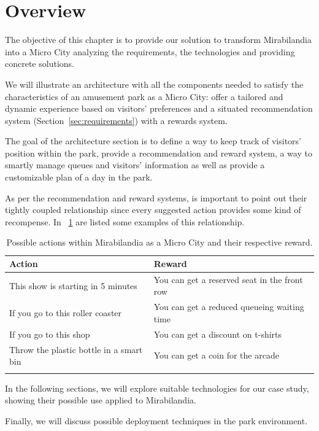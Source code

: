 \section{Overview}\label{sec:overview}
The objective of this chapter is to provide our solution to transform Mirabilandia into a Micro City analyzing the requirements, the technologies and providing concrete solutions.

We will illustrate an architecture with all the components needed to satisfy the characteristics of an amusement park as a Micro City: offer a tailored and dynamic experience based on visitors' preferences and a situated recommendation system (Section~\ref{sec:requirements}) with a rewards system.

The goal of the architecture section is to define a way to keep track of visitors' position within the park, provide a recommendation and reward system, a way to smartly manage queues and visitors' information as well as provide a customizable plan of a day in the park.

As per the recommendation and reward systems, is important to point out their tightly coupled relationship since every suggested action provides some kind of recompense.
In ~\ref{tab:actions-rewards} are listed some examples of this relationship.

\begin{longtable}{|l|l|}
	\hline
	\textbf{Action}                                  & \textbf{Reward}                      \\
	\hline
	This show is starting in 5 minutes  & You can get a reserved seat in the front row \\
	\hline
	If you go to this roller coaster    & You can get a reduced queueing waiting time           \\
	\hline
	If you go to this shop              & You can get a discount on t-shirts           \\
	\hline
	Throw the plastic bottle in a smart bin & You can get a coin for the arcade            \\
	\hline
	\caption{Possible actions within Mirabilandia as a Micro City and their respective reward.}
	\label{tab:actions-rewards}
\end{longtable}

In the following sections, we will explore suitable technologies for our case study, showing their possible use applied to Mirabilandia.

Finally, we will discuss possible deployment techniques in the park environment. 

